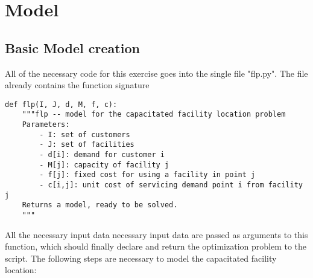 \documentclass[a4paper,10pt]{article}
\begin{document}
\section{Model}

\subsection{Basic Model creation}

All of the necessary code for this exercise goes into 
the single file "flp.py". The file already contains the 
function signature

\begin{lstlisting}
def flp(I, J, d, M, f, c):
    """flp -- model for the capacitated facility location problem
    Parameters:
        - I: set of customers
        - J: set of facilities
        - d[i]: demand for customer i
        - M[j]: capacity of facility j
        - f[j]: fixed cost for using a facility in point j
        - c[i,j]: unit cost of servicing demand point i from facility j
    Returns a model, ready to be solved.
    """ 
\end{lstlisting}

All the necessary input data necessary input data are passed as arguments to this function, which should finally declare and return the optimization problem to the script.
The following steps are necessary to 
model the capacitated facility location:
\end{document}
